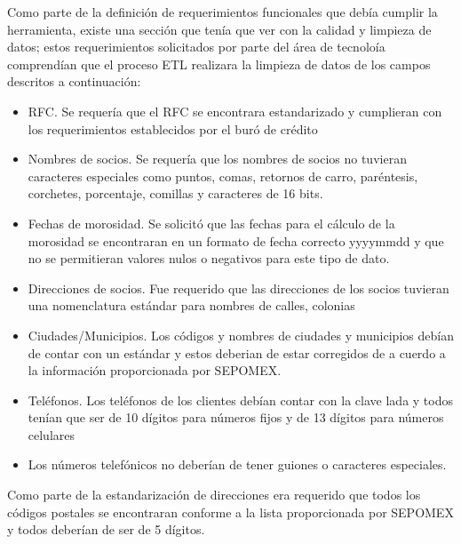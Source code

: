 Como parte de la definición de requerimientos funcionales que debía cumplir la
herramienta, existe una sección que tenía que ver con la calidad y limpieza de
datos; estos requerimientos solicitados por parte del área de tecnoloía
comprendían que el proceso ETL realizara la limpieza de datos de los campos
descritos a continuación:

\begin{itemize}

\item RFC. Se requería que el RFC se encontrara estandarizado y cumplieran con
  los requerimientos establecidos por el buró de crédito

\item Nombres de socios. Se requería que los nombres de socios no tuvieran
  caracteres especiales como puntos, comas, retornos de carro, paréntesis,
  corchetes, porcentaje, comillas y caracteres de 16 bits.

\item Fechas de morosidad. Se solicitó que las fechas para el cálculo de la
  morosidad se encontraran en un formato de fecha correcto yyyymmdd y que no se
  permitieran valores nulos o negativos para este tipo de dato.

\item Direcciones de socios. Fue requerido que las direcciones de los socios
  tuvieran una nomenclatura estándar para nombres de calles, colonias

\item Ciudades/Municipios. Los códigos y nombres de ciudades y municipios debían
  de contar con un estándar y estos deberian de estar corregidos de a cuerdo a
  la información proporcionada por SEPOMEX.

\item Teléfonos. Los teléfonos de los clientes debían contar con la clave lada y
  todos tenían que ser de 10 dígitos para números fijos y de 13 dígitos para
  números celulares

\item Los números telefónicos no deberían de tener guiones o caracteres
  especiales.

\end{itemize}

Como parte de la estandarización de direcciones era requerido que todos los
códigos postales se encontraran conforme a la lista proporcionada por SEPOMEX y
todos deberían de ser de 5 dígitos.

\cleardoublepage

